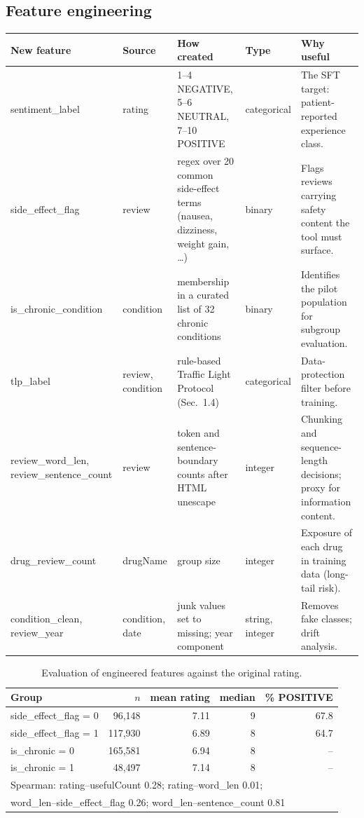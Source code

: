 \documentclass[11pt]{article}
\begin{document}
\subsection{Feature engineering}
\begin{table}[H]\centering\small
\begin{tabular}{p{2.8cm}p{1.9cm}p{4.3cm}p{1.5cm}p{3.9cm}}\toprule
New feature & Source & How created & Type & Why useful \\\midrule
sentiment\_label & rating & 1--4 NEGATIVE, 5--6 NEUTRAL, 7--10 POSITIVE & categorical & The SFT target: patient-reported experience class. \\
side\_effect\_flag & review & regex over 20 common side-effect terms (nausea, dizziness, weight gain, \ldots) & binary & Flags reviews carrying safety content the tool must surface. \\
is\_chronic\_condition & condition & membership in a curated list of 32 chronic conditions & binary & Identifies the pilot population for subgroup evaluation. \\
tlp\_label & review, condition & rule-based Traffic Light Protocol (Sec.~1.4) & categorical & Data-protection filter before training. \\
review\_word\_len, review\_sentence\_count & review & token and sentence-boundary counts after HTML unescape & integer & Chunking and sequence-length decisions; proxy for information content. \\
drug\_review\_count & drugName & group size & integer & Exposure of each drug in training data (long-tail risk). \\
condition\_clean, review\_year & condition, date & junk values set to missing; year component & string, integer & Removes fake classes; drift analysis. \\
\bottomrule\end{tabular}
\end{table}

\begin{table}[H]\centering\small
\caption{Evaluation of engineered features against the original rating.}
\begin{tabular}{lrrrr}\toprule
Group & $n$ & mean rating & median & \% POSITIVE \\\midrule
side\_effect\_flag = 0 & 96,148 & 7.11 & 9 & 67.8 \\
side\_effect\_flag = 1 & 117,930 & 6.89 & 8 & 64.7 \\
is\_chronic = 0 & 165,581 & 6.94 & 8 & -- \\
is\_chronic = 1 & 48,497 & 7.14 & 8 & -- \\
\midrule
\multicolumn{5}{l}{Spearman: rating--usefulCount 0.28; rating--word\_len 0.01;} \\
\multicolumn{5}{l}{word\_len--side\_effect\_flag 0.26; word\_len--sentence\_count 0.81} \\
\bottomrule\end{tabular}
\end{table}
\end{document}
